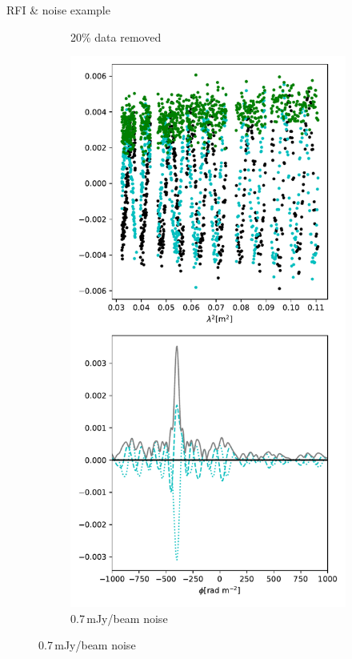 \documentclass[xetex,aspectratio=169]{beamer}
\begin{document}
\begin{frame}{RFI \& noise example}
\begin{figure}
\begin{subfigure}{0.2\textwidth}
                \caption{20\% data removed}
            \end{subfigure}
            \begin{subfigure}{0.2\textwidth}
                \includegraphics[width=\textwidth]{figures/dataset_features/data_noisy.pdf}
                \caption{0.7\,mJy/beam noise}
            \end{subfigure}
        \end{figure}
        
    \end{frame}
    
\end{document}
